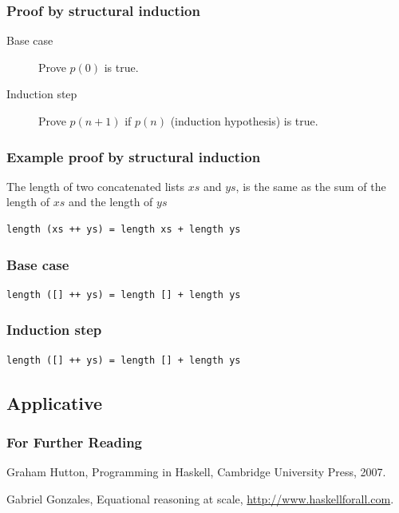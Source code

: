 \documentclass{beamer}
\begin{document}
\begin{frame}[fragile]
\frametitle{Proof by structural induction}
 \begin{description}
 \item[Base case] Prove $p(0)$ is true.
 \item[Induction step] Prove $p(n+1)$ if $p(n)$ (induction hypothesis) is true.
 \end{description}
\end{frame}

\begin{frame}[fragile]
\frametitle{Example proof by structural induction}
The length of two concatenated lists $xs$ and $ys$, is the same as the sum of the length of $xs$ and the length of $ys$
\begin{verbatim}
length (xs ++ ys) = length xs + length ys
\end{verbatim}

\end{frame}

\begin{frame}[fragile]
\frametitle{Base case}
\begin{verbatim}
length ([] ++ ys) = length [] + length ys
\end{verbatim}
\end{frame}

\begin{frame}[fragile]
\frametitle{Induction step}
\begin{verbatim}
length ([] ++ ys) = length [] + length ys
\end{verbatim}
\end{frame}



\subsection{Applicative}

\begin{frame}
  \frametitle{For Further Reading}

  \begin{thebibliography}{Subramaniam, 2011}

Graham Hutton,
Programming in Haskell,
Cambridge University Press,
2007.

Gabriel Gonzales,
Equational reasoning at scale, 
\url{http://www.haskellforall.com}.



\end{thebibliography}
\end{frame}
\end{document}
